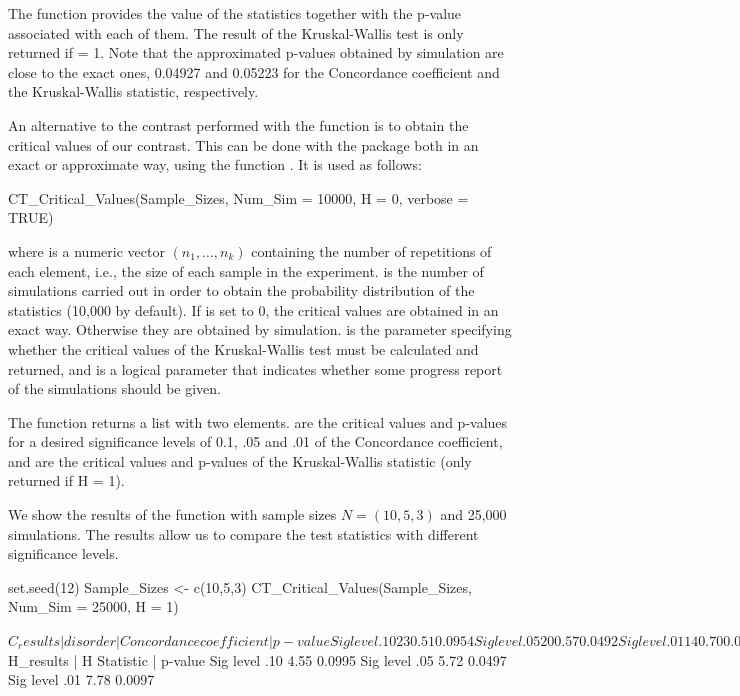 The function  provides the value of the statistics together with the p-value associated with each of them. The result of the Kruskal-Wallis test is only returned if  = 1. Note that the approximated p-values obtained by simulation are close to the exact ones, 0.04927 and 0.05223 for the Concordance coefficient and the Kruskal-Wallis statistic, respectively. 

An alternative to the contrast performed with the function  is to obtain the critical values of our contrast. This can be done with the  package both in an exact or approximate way, using the function . It is used as follows:
\begin{example}
CT_Critical_Values(Sample_Sizes, Num_Sim = 10000, H = 0, verbose = TRUE)
\end{example}
where  is a numeric vector $(n_1,\ldots,n_k)$ containing the number of repetitions of each element, i.e., the size of each sample in the experiment.  is the number of simulations carried out in order to obtain the probability distribution of the statistics (10,000 by default). If  is set to 0, the critical values are obtained in an exact way. Otherwise they are obtained by simulation.  is the parameter specifying whether the critical values of the Kruskal-Wallis test must be calculated and returned, and  is a logical parameter that indicates whether some progress report of the simulations should be given.

The function returns a list with two elements.  are the critical values and p-values for a desired significance levels of 0.1, .05 and .01 of the Concordance coefficient, and  are the critical values and p-values of the Kruskal-Wallis statistic (only returned if H = 1). 

\setcounter{exmp}{1}
\begin{exmp}[Cont.] 
We show the results of the function  with sample sizes $N=(10,5,3)$ and 25,000 simulations. The results allow us to compare the test statistics with different significance levels.
\end{exmp} 

\begin{example}
set.seed(12)
Sample_Sizes <- c(10,5,3)
CT_Critical_Values(Sample_Sizes, Num_Sim = 25000, H = 1)

$C_results
              |  disorder |  Concordance coefficient |  p-value
Sig level .10          23                       0.51     0.0954
Sig level .05          20                       0.57     0.0492
Sig level .01          14                       0.70     0.0096

$H_results
              |  H Statistic |  p-value
Sig level .10           4.55     0.0995
Sig level .05           5.72     0.0497
Sig level .01           7.78     0.0097
\end{example}

